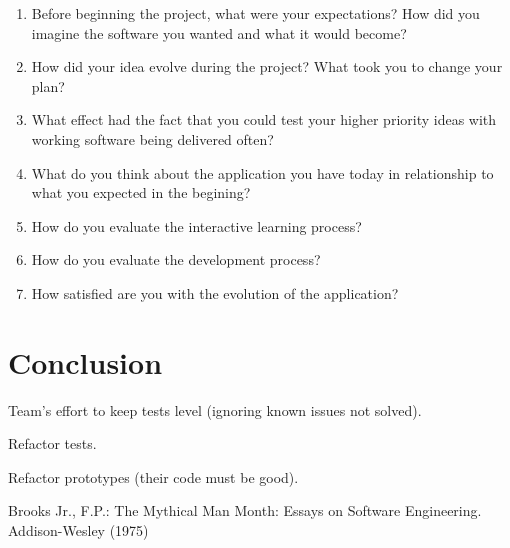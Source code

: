 \documentclass[lnbip]{svmultln}
\begin{document}
\begin{enumerate}
\item Before beginning the project, what were your expectations? How did you imagine the software you wanted and what it would become?
\item How did your idea evolve during the project? What took you to change your plan?
\item What effect had the fact that you could test your higher priority ideas with working software being delivered often?
\item What do you think about the application you have today in relationship to what you expected in the begining?
\item How do you evaluate the interactive learning process?
\item How do you evaluate the development process?
\item How satisfied are you with the evolution of the application?
\end{enumerate}

\section{Conclusion}
\label{sec:conclusion}

Team's effort to keep tests level (ignoring known issues not solved).

Refactor tests.

Refactor prototypes (their code must be good).

%
%
\begin{thebibliography}{5}

 Brooks Jr., F.P.: The Mythical Man Month: Essays
  on Software Engineering. Addison-Wesley (1975)




\end{thebibliography}
%
\end{document}
